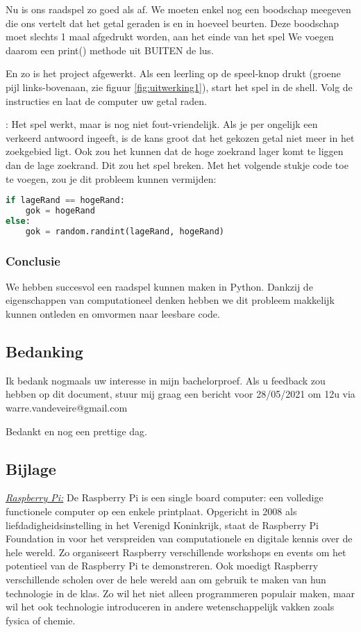 Nu is ons raadspel zo goed als af. We moeten enkel nog een boodschap meegeven die ons vertelt dat het getal geraden is en in hoeveel beurten. Deze boodschap moet slechts 1 maal afgedrukt worden, aan het einde van het spel
We voegen daarom een print() methode uit BUITEN de lus.

En zo is het project afgewerkt. Als een leerling op de speel-knop drukt (groene pijl links-bovenaan, zie figuur \ref{fig:uitwerking1}), start het spel in de shell. Volg de instructies en laat de computer uw getal raden.

: Het spel werkt, maar is nog niet fout-vriendelijk. Als je per ongelijk een verkeerd antwoord ingeeft, is de kans groot dat het gekozen getal niet meer in het zoekgebied ligt. Ook zou het kunnen dat de hoge zoekrand lager komt te liggen dan de lage zoekrand. Dit zou het spel breken. Met het volgende stukje code toe te voegen, zou je dit probleem kunnen vermijden:

\begin{lstlisting}[language=Python, caption=Volledige uitwerking van het raadspel in Python]
if lageRand == hogeRand:
    gok = hogeRand
else:
    gok = random.randint(lageRand, hogeRand)
\end{lstlisting}

\subsubsection{Conclusie}
We hebben succesvol een raadspel kunnen maken in Python. Dankzij de eigenschappen van computationeel denken hebben we dit probleem makkelijk kunnen ontleden en omvormen naar leesbare code.

\subsection{Bedanking}
Ik bedank nogmaals uw interesse in mijn bachelorproef. Als u feedback zou hebben op dit document, stuur mij graag een bericht voor 28/05/2021 om 12u via warre.vandeveire@gmail.com 

Bedankt en nog een prettige dag.

\subsection{Bijlage}
\emph{\underline{Raspberry Pi:}} 
De Raspberry Pi is een single board computer: een volledige functionele computer op een enkele printplaat.
Opgericht in 2008 als liefdadigheidsinstelling in het Verenigd Koninkrijk, staat de Raspberry Pi Foundation in voor het verspreiden van computationele en digitale kennis over de hele wereld. Zo organiseert Raspberry verschillende workshops en events om het potentieel van de Raspberry Pi te demonstreren.
Ook moedigt Raspberry verschillende scholen over de hele wereld aan om gebruik te maken van hun technologie in de klas. Zo wil het niet alleen programmeren populair maken, maar wil het ook technologie introduceren in andere wetenschappelijk vakken zoals fysica of chemie.

